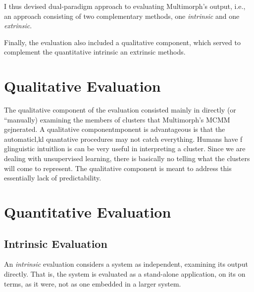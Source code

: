 
I thus devised dual-paradigm approach to evaluating Multimorph's output, i.e., an approach consisting of two complementary methods, %
one \emph{intrinsic} and one \emph{extrinsic}.

Finally, the evaluation also included a qualitative component, which served to complement the quantitative 
 intrinsic an extrinsic methods.


\section{Qualitative Evaluation}
The qualitative component of the evaluation consisted mainly in directly (or ``manually) examining the members of clusters that Multimorph's MCMM gejnerated. 
A qualitative componentmponent is advantageous is that the automaticl,kl quantative procedures may not catch everything. Humans have f glinguistic intuitlion is can be very useful in interpreting a cluster. Since we are dealing with unsupervised learning, there is basically no telling what the clusters will come to represent. The qualitative component is meant to address this essentially lack of predictability.

\section{Quantitative Evaluation}
\subsection{Intrinsic Evaluation}
An \emph{intrinsic} evaluation considers a system as independent, examining its 
output directly. That is, the system is evaluated as a stand-alone application, on its
on terms, as it were,
not as one embedded in a larger system.

